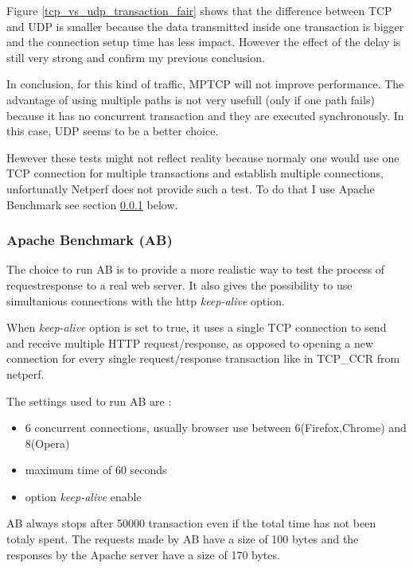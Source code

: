   Figure \ref{tcp_vs_udp_transaction_fair} shows that the difference between TCP and UDP is smaller because the data transmitted inside one transaction is bigger and
  the connection setup time has less impact. However the effect of the delay is still very strong and confirm my previous conclusion.

  In conclusion, for this kind of traffic, MPTCP will not improve performance. The advantage of using multiple paths is not very usefull (only if one path fails) because it has no concurrent transaction
  and they are executed synchronously. In this case, UDP seems to be a better choice.

  Hewever these tests might not reflect reality because normaly one would use one TCP connection for multiple transactions
  and  establish multiple connections, unfortunatly Netperf does not provide such a test. To do that I use Apache Benchmark see section \ref{sec:ab} below.

\subsubsection{Apache Benchmark (AB)} \label{sec:ab}

The choice to run AB is to provide a more realistic way to test the process of request\/response to a real web server.
It also gives the possibility to use simultanious connections with the http \textit{keep-alive} option.

When \textit{keep-alive} option is set to true, it uses a single TCP connection to send and receive multiple HTTP request/response,
as opposed to opening a new connection for every single request/response transaction like in TCP\_CCR from netperf.

The settings used to run AB are :

\begin{itemize}
\item 6 concurrent connections, usually browser use between 6(Firefox,Chrome) and 8(Opera)
\item maximum time of 60 seconds
\item option \textit{keep-alive} enable
\end{itemize}

AB always stops after 50000 transaction even if the total time has not been totaly spent.
The requests made by AB have a size of 100 bytes and the responses by the Apache server have a size of 170 bytes.

